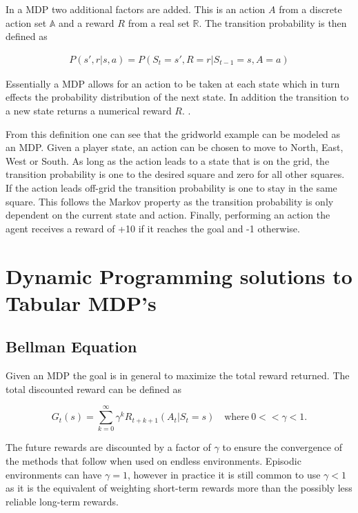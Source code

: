 In a MDP two additional factors are added. This is an action $A$ from a discrete action set $\mathbb{A}$ and a reward $R$ from a real set $\mathbb{R}$. The transition probability is then defined as

\begin{align}
    P(s',r|s,a) = P(S_{t}=s', R=r|S_{t-1}=s, A=a)
\end{align}

Essentially a MDP allows for an action to be taken at each state which in turn effects the probability distribution of the next state. In addition the transition to a new state returns a numerical reward $R$. \citep[p.~38]{sutton_barto_2018}. 

From this definition one can see that the gridworld example can be modeled as an MDP.  Given a player state, an action can be chosen to move to North, East, West or South. As long as the action leads to a state that is on the grid, the transition probability is one to the desired square and zero for all other squares. If the action leads off-grid the transition probability is one to stay in the same square. This follows the Markov property as the transition probability is only dependent on the current state and action. Finally, performing an action the agent receives a reward of +10 if it reaches the goal and -1 otherwise.  

\section{Dynamic Programming solutions to Tabular MDP's}

\subsection{Bellman Equation}

Given an MDP the goal is in general to maximize the total reward returned. The total discounted reward can be defined as

\begin{equation}
    \label{eq:return}
    G_t(s) = \sum_{k=0}^\infty \gamma^kR_{t+k+1}(A_t| S_t=s)\quad \text{where} ~ 0 << \gamma < 1.
\end{equation}

The future rewards are discounted by a factor of $\gamma$ to ensure the convergence of the methods that follow when used on endless environments. Episodic environments can have $\gamma=1$, however in practice it is still common to use $\gamma < 1$ as it is the equivalent of weighting short-term rewards more than the possibly less reliable long-term rewards.

